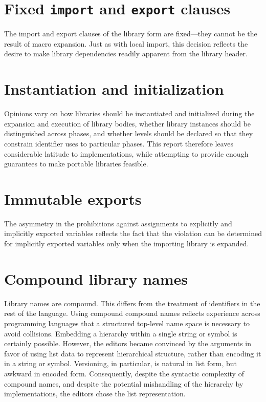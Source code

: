 \documentclass[twoside,twocolumn]{algol60}
\begin{document}
\section{Fixed {\tt import} and {\tt export} clauses}

The {\cf import} and {\cf export} clauses of the {\cf library} form
are fixed---they cannot be the result of macro expansion.  Just as
with local import, this decision reflects the desire to make library
dependencies readily apparent from the library header.

\section{Instantiation and initialization}

Opinions vary on how libraries should be instantiated and
initialized during the expansion and execution of library bodies,
whether library instances should be distinguished across phases,
and whether levels should be declared so that they constrain 
identifier uses to particular phases. This report therefore leaves
considerable latitude to implementations, while attempting to
provide enough guarantees to make portable libraries feasible.

\section{Immutable exports}

The asymmetry in the prohibitions against assignments to explicitly
and implicitly exported variables reflects the fact that the violation
can be determined for implicitly exported variables only when the
importing library is expanded.

\section{Compound library names}

Library names are compound.  This differs from the treatment of
identifiers in the rest of the language.  Using compound compound
names reflects experience across programming languages that a
structured top-level name space is necessary to avoid collisions.
Embedding a hierarchy within a single string or symbol is certainly
possible. However, the editors became convinced by the arguments in
favor of using list data to represent hierarchical structure, rather
than encoding it in a string or symbol.  Versioning, in particular, is
natural in list form, but awkward in encoded form.  Consequently,
despite the syntactic complexity of compound names, and despite the
potential mishandling of the hierarchy by implementations, the editors
chose the list representation.
\end{document}
